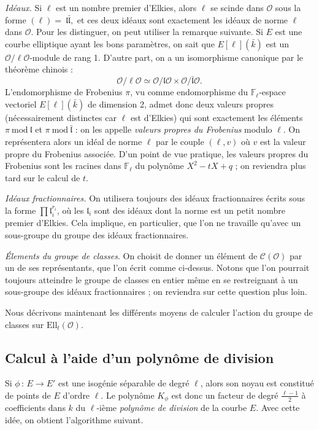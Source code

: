 \documentclass[11pt,a4paper]{article}
\newcommand{\F}{\mathbb{F}}
\renewcommand{\O}{\mathcal{O}}
\newcommand{\Cl}{\mathcal{C}}
\newcommand{\vers}{\longrightarrow}
\newcommand{\Ell}{\mathrm{Ell}}
\renewcommand{\frak}{\mathfrak}
\newcommand{\de}{\,:\,}
\renewcommand{\mod}{\ \mathrm{mod}\ }
\theoremstyle{definition}
\begin{document}
\emph{Idéaux.} Si $\ell$ est un nombre premier d'Elkies, alors $\ell$ se scinde dans $\O$ sous la forme $(\ell) =~\frak l \bar{\frak l},$
et ces deux idéaux sont exactement les idéaux de norme $\ell$ dans $\O$. Pour les distinguer, on peut utiliser la remarque suivante. Si $E$ est une courbe elliptique ayant les bons paramètres, on sait que $E[\ell](\bar{k})$ est un $\O/\ell\O$-module de rang 1. D'autre part, on a un isomorphisme canonique par le théorème chinois :
$$\O/\ell\O \simeq \O/\frak l \O \times \O/\bar{\frak l} \O.$$
L'endomorphisme de Frobenius $\pi$, vu comme endomorphisme du $\F_\ell$-espace vectoriel $E[\ell](\bar{k})$ de dimension 2, admet donc deux valeurs propres (nécessairement distinctes car $\ell$ est d'Elkies) qui sont exactement les éléments $\pi\mod \frak l$ et $\pi\mod \bar{\frak l}$ : on les appelle \emph{valeurs propres du Frobenius} modulo $\ell$. On représentera alors un idéal de norme $\ell$ par le couple $(\ell, v)$ où $v$ est la valeur propre du Frobenius associée. D'un point de vue pratique, les valeurs propres du Frobenius sont les racines dans $\F_\ell$ du polynôme $X^2 - tX + q$ ; on reviendra plus tard sur le calcul de $t$.

\emph{Idéaux fractionnaires.} On utilisera toujours des idéaux fractionnaires écrits sous la forme $\prod {\frak l}_i^{r_i}$, où les ${\frak l}_i$ sont des idéaux dont la norme est un petit nombre premier d'Elkies. Cela implique, en particulier, que l'on ne travaille qu'avec un sous-groupe du groupe des idéaux fractionnaires.

\emph{\'Elements du groupe de classes}. On choisit de donner un élément de $\Cl(\O)$ par un de ses représentants, que l'on écrit comme ci-dessus. Notons que l'on pourrait toujours atteindre le groupe de classes en entier même en se restreignant à un sous-groupe des idéaux fractionnaires ; on reviendra sur cette question plus loin.

Nous décrivons maintenant les différents moyens de calculer l'action du groupe de classes sur $\Ell_t(\O)$.



\subsection{Calcul à l'aide d'un polynôme de division}

Si $\phi\de E\vers E'$ est une isogénie séparable de degré $\ell$, alors son noyau est constitué de points de $E$ d'ordre $\ell$. Le polynôme $K_\phi$ est donc un facteur de degré $\frac{\ell-1}{2}$ à coefficients dans $k$ du $\ell$-ième \emph{polynôme de division} de la courbe $E$. Avec cette idée, on obtient l'algorithme suivant.
\end{document}
